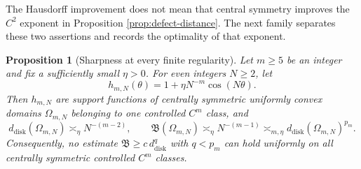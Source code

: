\documentclass[12pt]{article}
\numberwithin{equation}{section}
\newtheorem{proposition}[theorem]{Proposition}
\numberwithin{equation}{section}
\begin{document}
The Hausdorff improvement does not mean that central symmetry improves the
$C^2$ exponent in Proposition \ref{prop:defect-distance}. The next family
separates these two assertions and records the optimality of that exponent.

\begin{proposition}[Sharpness at every finite regularity]
\label{prop:scale-sharpness}
Let $m\geq5$ be an integer and fix a sufficiently small $\eta>0$. For even
integers $N\geq2$, let
\begin{equation*}\label{eq:sharp-family}
 h_{m,N}(\theta)=1+\eta N^{-m}\cos(N\theta).
\end{equation*}
Then $h_{m,N}$ are support functions of centrally symmetric uniformly convex
domains $\Omega_{m,N}$ belonging to one controlled $C^m$ class, and
\begin{equation}\label{eq:sharp-asymptotics}
 d_{\mathrm{disk}}\left(\Omega_{m,N}\right)\asymp_\eta N^{-(m-2)},
 \qquad
 \mathfrak B\left(\Omega_{m,N}\right)\asymp_\eta N^{-(m-1)}
 \asymp_{m,\eta} d_{\mathrm{disk}}\left(\Omega_{m,N}\right)^{p_m}.
\end{equation}
Consequently, no estimate
$\mathfrak B\geq c\,d_{\mathrm{disk}}^{q}$ with $q<p_m$ can hold uniformly on
all centrally symmetric controlled $C^m$ classes.
\end{proposition}
\end{document}
